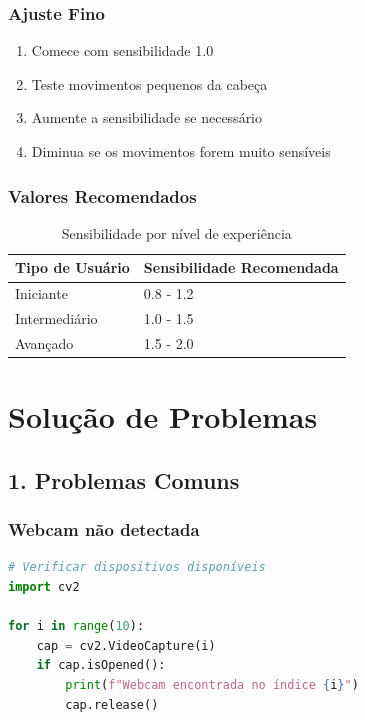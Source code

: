 \documentclass[12pt,a4paper]{article}
\begin{document}
\subsubsection{Ajuste Fino}

\begin{enumerate}
    \item Comece com sensibilidade 1.0
    \item Teste movimentos pequenos da cabeça
    \item Aumente a sensibilidade se necessário
    \item Diminua se os movimentos forem muito sensíveis
\end{enumerate}

\subsubsection{Valores Recomendados}

\begin{table}[H]
\centering
\begin{tabular}{|l|l|}
\hline
\textbf{Tipo de Usuário} & \textbf{Sensibilidade Recomendada} \\
\hline
Iniciante & 0.8 - 1.2 \\
Intermediário & 1.0 - 1.5 \\
Avançado & 1.5 - 2.0 \\
\hline
\end{tabular}
\caption{Sensibilidade por nível de experiência}
\end{table}

\section{Solução de Problemas}

\subsection{1. Problemas Comuns}

\subsubsection{Webcam não detectada}

\begin{lstlisting}[language=python]
# Verificar dispositivos disponíveis
import cv2

for i in range(10):
    cap = cv2.VideoCapture(i)
    if cap.isOpened():
        print(f"Webcam encontrada no índice {i}")
        cap.release()
\end{lstlisting}
\end{document}
